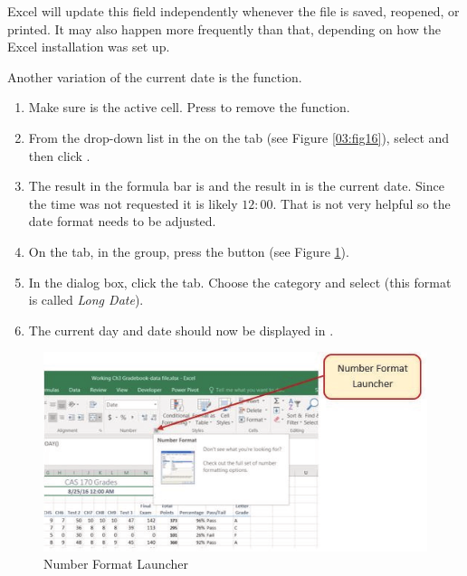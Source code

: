 Excel will update this field independently whenever the file is saved, reopened, or printed. It may also happen more frequently than that, depending on how the Excel installation was set up.

Another variation of the current date is the  function.

\begin{enumerate}
	\item Make sure  is the active cell. Press  to remove the  function.
	\item From the  drop-down list in the  on the  tab (see Figure \ref{03:fig16}), select  and then click .
	\item The result in the formula bar is  and the result in  is the current date. Since the time was not requested it is likely $ 12\!:\!00 $. That is not very helpful so the date format needs to be adjusted.
	\item On the  tab, in the  group, press the  button (see Figure \ref{03:fig17}).
	\item In the  dialog box, click the  tab. Choose the  category and select  (this format is called \textit{Long Date}).
	\item The current day and date should now be displayed in .
\end{enumerate}

\begin{figure}[H]
	\centering
	\includegraphics[width=\maxwidth{.95\linewidth}]{gfx/ch03_fig17}
	\caption{Number Format Launcher}
	\label{03:fig17}
\end{figure}

